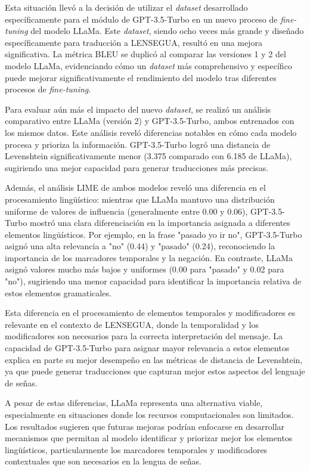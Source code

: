 Esta situación llevó a la decisión de utilizar el \textit{dataset} desarrollado específicamente para el módulo de GPT-3.5-Turbo en un nuevo proceso de \textit{fine-tuning} del modelo LLaMa. Este \textit{dataset}, siendo ocho veces más grande y diseñado específicamente para traducción a LENSEGUA, resultó en una mejora significativa. La métrica BLEU se duplicó al comparar las versiones 1 y 2 del modelo LLaMa, evidenciando cómo un \textit{dataset} más comprehensivo y específico puede mejorar significativamente el rendimiento del modelo tras diferentes procesos de \textit{fine-tuning}.

Para evaluar aún más el impacto del nuevo \textit{dataset}, se realizó un análisis comparativo entre LLaMa (versión 2) y GPT-3.5-Turbo, ambos entrenados con los mismos datos. Este análisis reveló diferencias notables en cómo cada modelo procesa y prioriza la información. GPT-3.5-Turbo logró una distancia de Levenshtein significativamente menor (3.375 comparado con 6.185 de LLaMa), sugiriendo una mejor capacidad para generar traducciones más precisas.

Además, el análisis LIME de ambos modelos reveló una diferencia en el procesamiento lingüístico: mientras que LLaMa mantuvo una distribución uniforme de valores de influencia (generalmente entre 0.00 y 0.06), GPT-3.5-Turbo mostró una clara diferenciación en la importancia asignada a diferentes elementos lingüísticos. Por ejemplo, en la frase "pasado yo ir no", GPT-3.5-Turbo asignó una alta relevancia a "no" (0.44) y "pasado" (0.24), reconociendo la importancia de los marcadores temporales y la negación. En contraste, LLaMa asignó valores mucho más bajos y uniformes (0.00 para "pasado" y 0.02 para "no"), sugiriendo una menor capacidad para identificar la importancia relativa de estos elementos gramaticales.

Esta diferencia en el procesamiento de elementos temporales y modificadores es relevante en el contexto de LENSEGUA, donde la temporalidad y los modificadores son necesarios para la correcta interpretación del mensaje. La capacidad de GPT-3.5-Turbo para asignar mayor relevancia a estos elementos explica en parte su mejor desempeño en las métricas de distancia de Levenshtein, ya que puede generar traducciones que capturan mejor estos aspectos del lenguaje de señas.

A pesar de estas diferencias, LLaMa representa una alternativa viable, especialmente en situaciones donde los recursos computacionales son limitados. Los resultados sugieren que futuras mejoras podrían enfocarse en desarrollar mecanismos que permitan al modelo identificar y priorizar mejor los elementos lingüísticos, particularmente los marcadores temporales y modificadores contextuales que son necesarios en la lengua de señas.





